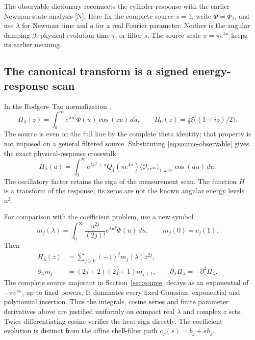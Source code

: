 \documentclass[11pt,letterpaper]{article}
\numberwithin{equation}{section}
\theoremstyle{remark}
\newcommand{\dd}{\,d}
\newcommand{\evid}[1]{\textsf{[#1]}}
\begin{document}
The observable dictionary reconnects the cylinder response with the
earlier Newman-state analysis \evid{N}. Here fix the complete source
\(s=1\), write \(\Phi=\Phi_1\), and use \(\lambda\) for Newman
time and \(a\) for a real Fourier parameter. Neither is the angular
damping \(\beta\), physical evolution time \(\tau\), or filter \(s\).
The source scale \(x=\pi e^{4u}\) keeps its earlier meaning.

\subsection{The canonical transform is a signed energy-response scan}

In the Rodgers--Tao normalization \cite[Introduction, (1)--(4)]{RT},
\begin{equation}
 H_\lambda(z)=\int_0^\infty e^{\lambda u^2}\Phi(u)\cos(zu)\dd u,
 \qquad H_0(z)=\tfrac18\xi\bigl((1+iz)/2\bigr).
 \label{eq:newman-transform}
\end{equation}
The source is even on the full line by the complete theta identity;
that property is not imposed on a general filtered source. Substituting
\eqref{eq:source-observable} gives the exact physical-response crosswalk
\begin{equation}
 H_\lambda(a)=\int_0^\infty e^{\lambda u^2+u}Q_1(\pi e^{4u})
 \langle\mathcal O_{\pi e^{4u}}\rangle_{1,\pi e^{4u}}
 \cos(au)\dd u.
 \label{eq:newman-energy-scan}
\end{equation}
The oscillatory factor retains the sign of the measurement scan.
The function \(H\) is a transform of the response; its zeros are not
the known angular energy levels \(n^2\).

For comparison with the coefficient problem, use a new symbol
\begin{equation}
 m_j(\lambda)=\int_0^\infty\frac{u^{2j}}{(2j)!}
             e^{\lambda u^2}\Phi(u)\dd u,
 \qquad m_j(0)=c_j(1).
 \label{eq:newman-moments}
\end{equation}
Then
\begin{equation}
 \begin{aligned}
 H_\lambda(z)&=\sum_{j\ge0}(-1)^jm_j(\lambda)z^{2j},\\
 \partial_\lambda m_j&=(2j+2)(2j+1)m_{j+1},\qquad
 \partial_\lambda H_\lambda=-\partial_z^2H_\lambda.
 \end{aligned}
 \label{eq:newman-coefficient-flow}
\end{equation}
The complete source majorant in Section~\ref{sec:source} decays as
an exponential of \(-\pi e^{4u}\), up to fixed powers. It dominates
every fixed Gaussian, exponential and polynomial insertion. Thus
the integrals, cosine series and finite parameter derivatives above
are justified uniformly on compact real \(\lambda\) and complex \(z\)
sets. Twice differentiating cosine verifies the heat sign directly.
The coefficient evolution is distinct from the affine shell-filter
path \(c_j(s)=b_j+sh_j\).
\end{document}
